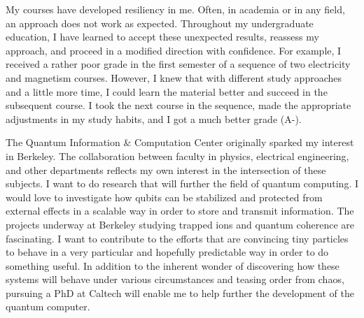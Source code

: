 {    My courses have developed resiliency in me. Often, in academia or in any
    field, an approach does not work as expected. Throughout my undergraduate
    education, I have learned to accept these unexpected results, reassess my
    approach, and proceed in a modified direction with confidence.  For
    example, I received a rather poor grade in the first semester of a sequence
    of two electricity and magnetism courses. However, I knew that with
    different study approaches and a little more time, I could learn the
    material better and succeed in the subsequent course. I took the next
    course in the sequence, made the appropriate adjustments in my study
    habits, and I got a much better grade (A-).

    The Quantum Information \& Computation Center originally sparked my
    interest in Berkeley. The collaboration between faculty in physics,
    electrical engineering, and other departments reflects my own interest in
    the intersection of these subjects. I want to do research that will further
    the field of quantum computing. I would love to investigate how qubits can
    be stabilized and protected from external effects in a scalable way in
    order to store and transmit information. The projects underway at Berkeley
    studying trapped ions and quantum coherence are fascinating. I want to
    contribute to the efforts that are convincing tiny particles to behave in a
    very particular and hopefully predictable way in order to do something
    useful. In addition to the inherent wonder of discovering how these systems
    will behave under various circumstances and teasing order from chaos,
    pursuing a PhD at Caltech will enable me to help further the development of
    the quantum computer.
}



